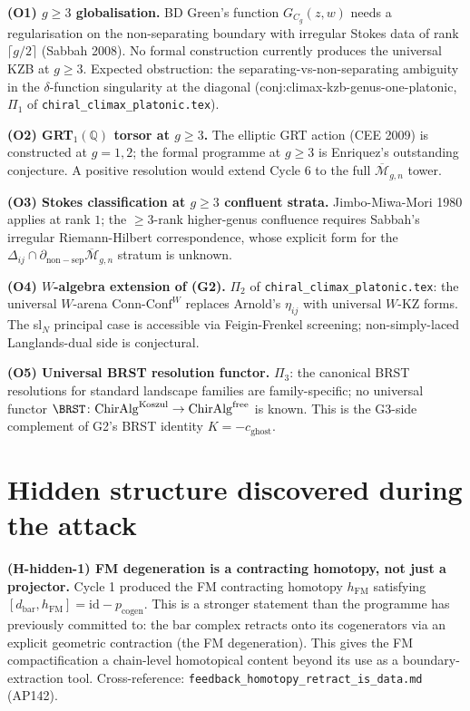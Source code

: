 \documentclass[12pt]{article}
\providecommand{\Mbar}{\overline{\mathcal{M}}}
\providecommand{\dbar}{d_{\mathrm{bar}}}
\providecommand{\ChirAlg}{\mathrm{ChirAlg}}
\providecommand{\ConnConf}{\mathrm{Conn\text{-}Conf}}
\theoremstyle{definition}
\begin{document}
\textbf{(O1) $g \geq 3$ globalisation.}
BD Green's function $G_{C_g}(z, w)$ needs a regularisation on
the non-separating boundary with irregular Stokes data of
rank $\lceil g/2 \rceil$ (Sabbah 2008).  No formal construction
currently produces the universal KZB at $g \geq 3$.  Expected
obstruction: the separating-vs-non-separating ambiguity in
the $\delta$-function singularity at the diagonal
(conj:climax-kzb-genus-one-platonic, $\Pi_1$ of
\texttt{chiral\_climax\_platonic.tex}).

\textbf{(O2) GRT$_1(\mathbb{Q})$ torsor at $g \geq 3$.}
The elliptic GRT action (CEE 2009) is constructed at $g = 1, 2$;
the formal programme at $g \geq 3$ is Enriquez's outstanding
conjecture.  A positive resolution would extend Cycle 6 to
the full $\Mbar_{g,n}$ tower.

\textbf{(O3) Stokes classification at $g \geq 3$ confluent
strata.}
Jimbo-Miwa-Mori 1980 applies at rank $1$; the $\geq 3$-rank
higher-genus confluence requires Sabbah's irregular
Riemann-Hilbert correspondence, whose explicit form for the
$\Delta_{ij} \cap \partial_{\mathrm{non-sep}}\Mbar_{g,n}$
stratum is unknown.

\textbf{(O4) $W$-algebra extension of (G2).}
$\Pi_2$ of \texttt{chiral\_climax\_platonic.tex}: the
universal $W$-arena $\ConnConf^{W}$ replaces Arnold's
$\eta_{ij}$ with universal $W$-KZ forms.  The sl$_N$
principal case is accessible via Feigin-Frenkel screening;
non-simply-laced Langlands-dual side is conjectural.

\textbf{(O5) Universal BRST resolution functor.}
$\Pi_3$: the canonical BRST resolutions for standard
landscape families are family-specific; no universal
functor $\BRST \colon \ChirAlg^{\mathrm{Koszul}} \to
\ChirAlg^{\mathrm{free}}$ is known.  This is the G3-side
complement of G2's BRST identity $K = -c_{\mathrm{ghost}}$.

\section{Hidden structure discovered during the attack}
\label{sec:G2-hidden}

\textbf{(H-hidden-1) FM degeneration is a contracting homotopy,
not just a projector.}
Cycle 1 produced the FM contracting homotopy $h_{\mathrm{FM}}$
satisfying $[\dbar, h_{\mathrm{FM}}] = \mathrm{id} - p_{\mathrm{cogen}}$.
This is a stronger statement than the programme has previously
committed to: the bar complex retracts onto its cogenerators
via an explicit geometric contraction (the FM degeneration).
This gives the FM compactification a chain-level homotopical
content beyond its use as a boundary-extraction tool.
Cross-reference: \texttt{feedback\_homotopy\_retract\_is\_data.md}
(AP142).
\end{document}
